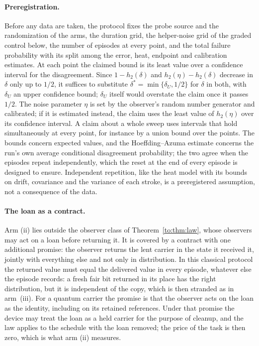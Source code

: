 \paragraph{Preregistration.} Before any data are taken, the protocol fixes the probe source and the randomization of the arms, the duration grid, the helper-noise grid of the graded control below, the number of episodes at every point, and the total failure probability with its split among the error, heat, endpoint and calibration estimates. At each point the claimed bound is its least value over a confidence interval for the disagreement. Since $1-h_2(\delta)$ and $h_2(\eta)-h_2(\delta)$ decrease in $\delta$ only up to $1/2$, it suffices to substitute $\delta^*=\min\{\delta_U,1/2\}$ for $\delta$ in both, with $\delta_U$ an upper confidence bound; $\delta_U$ itself would overstate the claim once it passes $1/2$. The noise parameter $\eta$ is set by the observer's random number generator and calibrated; if it is estimated instead, the claim uses the least value of $h_2(\eta)$ over its confidence interval. A claim about a whole sweep uses intervals that hold simultaneously at every point, for instance by a union bound over the points. The bounds concern expected values, and the Hoeffding--Azuma estimate concerns the run's own average conditional disagreement probability; the two agree when the episodes repeat independently, which the reset at the end of every episode is designed to ensure. Independent repetition, like the heat model with its bounds on drift, covariance and the variance of each stroke, is a preregistered assumption, not a consequence of the data.

\paragraph{The loan as a contract.} Arm (ii) lies outside the observer class of Theorem~\ref{to:thm:law}, whose observers may act on a loan before returning it. It is covered by a contract with one additional promise: the observer returns the lent carrier in the state it received it, jointly with everything else and not only in distribution. In this classical protocol the returned value must equal the delivered value in every episode, whatever else the episode records: a fresh fair bit returned in its place has the right distribution, but it is independent of the copy, which is then stranded as in arm~(iii). For a quantum carrier the promise is that the observer acts on the loan as the identity, including on its retained references. Under that promise the device may treat the loan as a held carrier for the purpose of cleanup, and the law applies to the schedule with the loan removed; the price of the task is then zero, which is what arm (ii) measures.

